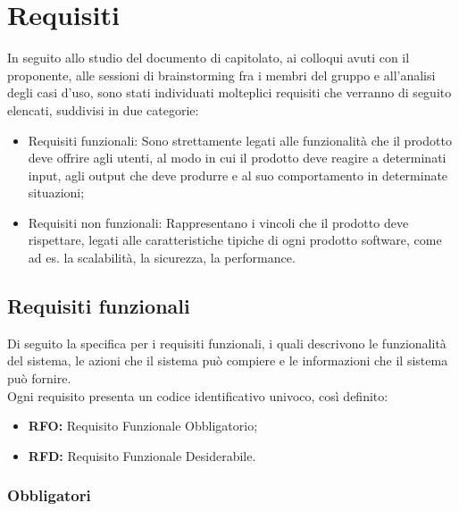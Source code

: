 \section{Requisiti}

In seguito allo studio del documento di capitolato, ai colloqui avuti con il proponente, alle sessioni di
brainstorming fra i membri del gruppo e all'analisi degli casi d'uso, sono stati individuati molteplici requisiti
che verranno di seguito elencati, suddivisi in due categorie:

\begin{itemize}
    \item Requisiti funzionali: Sono strettamente legati alle funzionalità che il prodotto deve offrire agli utenti, al modo in cui il prodotto deve reagire a determinati input, agli output che deve produrre e al suo comportamento in determinate situazioni;
    \item Requisiti non funzionali: Rappresentano i vincoli che il prodotto deve rispettare, legati alle caratteristiche tipiche di ogni prodotto software, come ad es. la scalabilità, la sicurezza, la performance.
\end{itemize}

\subsection{Requisiti funzionali}

Di seguito la specifica per i requisiti funzionali, i quali descrivono le funzionalità del sistema, le azioni che il sistema può compiere e le informazioni che il sistema può fornire.\\
Ogni requisito presenta un codice identificativo univoco, così definito:
\begin{itemize}
    \item \textbf{RFO:} Requisito Funzionale Obbligatorio;
    \item \textbf{RFD:} Requisito Funzionale Desiderabile.
\end{itemize}

\subsubsection{Obbligatori}

